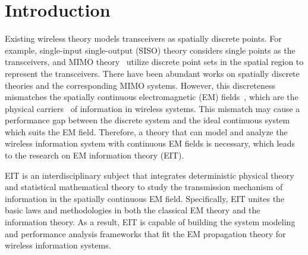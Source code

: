 \documentclass[journal,twocolumn]{IEEEtran}
\begin{document}
\section{Introduction}
Existing wireless theory models transceivers as spatially discrete points. For example, single-input single-output (SISO) theory considers single points as the transceivers, and MIMO theory~\cite{goldsmith2003capacity} utilize discrete point sets in the spatial region to represent the transceivers. 
There have been abundant works on spatially discrete theories and the corresponding MIMO systems. 
However, this discreteness mismatches the spatially continuous electromagnetic (EM) fields~\cite{huang2020holographic}, which are the physical carriers~\cite{migliore2018horse} of information in wireless systems. 
This mismatch may cause a performance gap between the discrete system and the ideal continuous system which suits the EM field. 
Therefore, a theory that can model and analyze the wireless information system with continuous EM fields is necessary, which leads to the research on EM information theory (EIT).

EIT is an interdisciplinary subject that integrates deterministic physical theory and statistical mathematical theory to study the transmission mechanism of information in the spatially continuous EM field. 
Specifically, EIT unites the basic laws and methodologies in both the classical EM theory and the information theory. 
As a result, EIT is capable of building the system modeling and performance analysis frameworks that fit the EM propagation theory for wireless information systems. 
\end{document}
